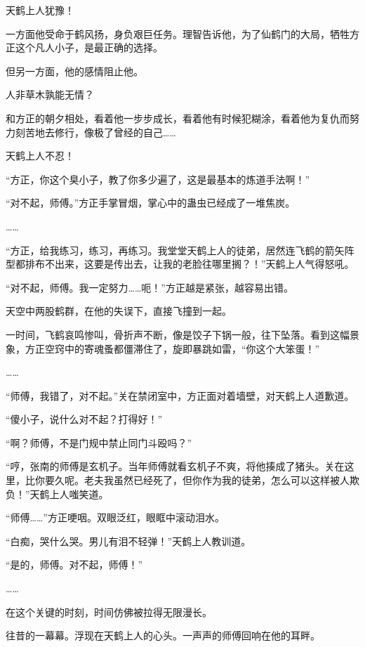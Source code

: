 
\begin{this_body}



天鹤上人犹豫！

一方面他受命于鹤风扬，身负艰巨任务。理智告诉他，为了仙鹤门的大局，牺牲方正这个凡人小子，是最正确的选择。

但另一方面，他的感情阻止他。

人非草木孰能无情？

和方正的朝夕相处，看着他一步步成长，看着他有时候犯糊涂，看着他为复仇而努力刻苦地去修行，像极了曾经的自己……

天鹤上人不忍！

“方正，你这个臭小子，教了你多少遍了，这是最基本的炼道手法啊！”

“对不起，师傅。”方正手掌冒烟，掌心中的蛊虫已经成了一堆焦炭。

……

“方正，给我练习，练习，再练习。我堂堂天鹤上人的徒弟，居然连飞鹤的箭矢阵型都排布不出来，这要是传出去，让我的老脸往哪里搁？！”天鹤上人气得怒吼。

“对不起，师傅。我一定努力……呃！”方正越是紧张，越容易出错。

天空中两股鹤群，在他的失误下，直接飞撞到一起。

一时间，飞鹤哀鸣惨叫，骨折声不断，像是饺子下锅一般，往下坠落。看到这幅景象，方正空窍中的寄魂蚤都僵滞住了，旋即暴跳如雷，“你这个大笨蛋！”

……

“师傅，我错了，对不起。”关在禁闭室中，方正面对着墙壁，对天鹤上人道歉道。

“傻小子，说什么对不起？打得好！”

“啊？师傅，不是门规中禁止同门斗殴吗？”

“哼，张南的师傅是玄机子。当年师傅就看玄机子不爽，将他揍成了猪头。关在这里，比你要久呢。老夫我虽然已经死了，但你作为我的徒弟，怎么可以这样被人欺负！”天鹤上人嗤笑道。

“师傅……”方正哽咽。双眼泛红，眼眶中滚动泪水。

“白痴，哭什么哭。男儿有泪不轻弹！”天鹤上人教训道。

“是的，师傅。对不起，师傅！”

……

在这个关键的时刻，时间仿佛被拉得无限漫长。

往昔的一幕幕。浮现在天鹤上人的心头。一声声的师傅回响在他的耳畔。


\end{this_body}
